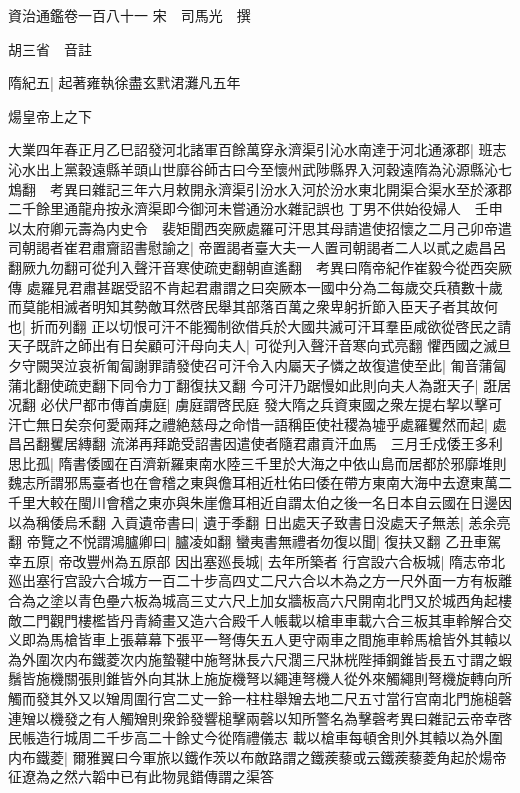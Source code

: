 資治通鑑卷一百八十一
宋　司馬光　撰

胡三省　音註

隋紀五|{
	起著雍執徐盡玄黓涒灘凡五年}


煬皇帝上之下

大業四年春正月乙巳詔發河北諸軍百餘萬穿永濟渠引沁水南達于河北通涿郡|{
	班志沁水出上黨穀遠縣羊頭山世靡谷師古曰今至懷州武陟縣界入河穀遠隋為沁源縣沁七鴆翻　考異曰雜記三年六月敕開永濟渠引汾水入河於汾水東北開渠合渠水至於涿郡二千餘里通龍舟按永濟渠即今御河未嘗通汾水雜記誤也}
丁男不供始役婦人　壬申以太府卿元壽為内史令　裴矩聞西突厥處羅可汗思其母請遣使招懷之二月己卯帝遣司朝謁者崔君肅齎詔書慰諭之|{
	帝置謁者臺大夫一人置司朝謁者二人以貳之處昌呂翻厥九勿翻可從刋入聲汗音寒使疏吏翻朝直遙翻　考異曰隋帝紀作崔毅今從西突厥傳}
處羅見君肅甚踞受詔不肯起君肅謂之曰突厥本一國中分為二每歲交兵積數十歲而莫能相滅者明知其勢敵耳然啓民舉其部落百萬之衆卑躬折節入臣天子者其故何也|{
	折而列翻}
正以切恨可汗不能獨制欲借兵於大國共滅可汗耳羣臣咸欲從啓民之請天子既許之師出有日矣顧可汗母向夫人|{
	可從刋入聲汗音寒向式亮翻}
懼西國之滅旦夕守闕哭泣哀祈匍匐謝罪請發使召可汗令入内屬天子憐之故復遣使至此|{
	匍音蒲匐蒲北翻使疏吏翻下同令力丁翻復扶又翻}
今可汗乃踞慢如此則向夫人為誑天子|{
	誑居况翻}
必伏尸都市傳首虜庭|{
	虜庭謂啓民庭}
發大隋之兵資東國之衆左提右挈以擊可汗亡無日矣奈何愛兩拜之禮絶慈母之命惜一語稱臣使社稷為墟乎處羅矍然而起|{
	處昌呂翻矍居縳翻}
流涕再拜跪受詔書因遣使者隨君肅貢汗血馬　三月壬戍倭王多利思比孤|{
	隋書倭國在百濟新羅東南水陸三千里於大海之中依山島而居都於邪靡堆則魏志所謂邪馬臺者也在會稽之東與儋耳相近杜佑曰倭在帶方東南大海中去遼東萬二千里大較在閩川會稽之東亦與朱崖儋耳相近自謂太伯之後一名日本自云國在日邊因以為稱倭烏禾翻}
入貢遺帝書曰|{
	遺于季翻}
日出處天子致書日没處天子無恙|{
	恙余亮翻}
帝覽之不悦謂鴻臚卿曰|{
	臚凌如翻}
蠻夷書無禮者勿復以聞|{
	復扶又翻}
乙丑車駕幸五原|{
	帝改豐州為五原部}
因出塞廵長城|{
	去年所築者}
行宫設六合板城|{
	隋志帝北廵出塞行宫設六合城方一百二十步高四丈二尺六合以木為之方一尺外面一方有板離合為之塗以青色壘六板為城高三丈六尺上加女牆板高六尺開南北門又於城西角起樓敵二門觀門樓檻皆丹青綺畫又造六合殿千人帳載以槍車車載六合三板其車軨解合交义即為馬槍皆車上張幕幕下張平一弩傳矢五人更守兩車之間施車軨馬槍皆外其轅以為外圍次内布鐵菱次内施蟄鞬中施弩牀長六尺濶三尺牀桄陛挿鋼錐皆長五寸謂之蝦鬚皆施機關張則錐皆外向其牀上施旋機弩以繩連弩機人從外來觸繩則弩機旋轉向所觸而發其外又以矰周圍行宫二丈一鈴一柱柱舉矰去地二尺五寸當行宫南北門施槌磬連矰以機發之有人觸矰則衆鈴發響槌擊兩磬以知所警名為擊磬考異曰雜記云帝幸啓民帳造行城周二千步高二十餘丈今從隋禮儀志}
載以槍車每頓舍則外其轅以為外圍内布鐵菱|{
	爾雅翼曰今軍旅以鐵作茨以布敵路謂之鐵蒺藜或云鐵蒺藜菱角起於煬帝征遼為之然六韜中已有此物晁錯傳謂之渠答}
